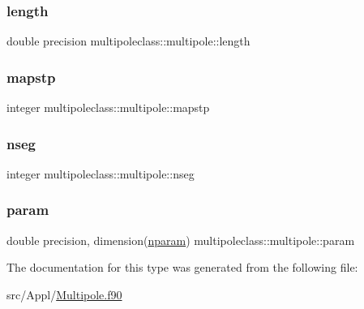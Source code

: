 \subsubsection{\texorpdfstring{length}{length}}
{\footnotesize\ttfamily double precision multipoleclass\+::multipole\+::length}

\mbox{\label{structmultipoleclass_1_1multipole_a4d8dd9ec28f1f2396c1fe8634b1ffb81}} 
\subsubsection{\texorpdfstring{mapstp}{mapstp}}
{\footnotesize\ttfamily integer multipoleclass\+::multipole\+::mapstp}

\mbox{\label{structmultipoleclass_1_1multipole_a7e808e5433de77a1defc9a21691400dc}} 
\subsubsection{\texorpdfstring{nseg}{nseg}}
{\footnotesize\ttfamily integer multipoleclass\+::multipole\+::nseg}

\mbox{\label{structmultipoleclass_1_1multipole_ab06c87e37bb85347c808f7e43bd9bd1f}} 
\subsubsection{\texorpdfstring{param}{param}}
{\footnotesize\ttfamily double precision, dimension(\mbox{\hyperlink{namespacemultipoleclass_a67bb1a71461cf39cdd365adab7fec8b9}{nparam}}) multipoleclass\+::multipole\+::param}



The documentation for this type was generated from the following file\+:\begin{DoxyCompactItemize}
\item 
src/\+Appl/\mbox{\hyperlink{_multipole_8f90}{Multipole.\+f90}}\end{DoxyCompactItemize}
